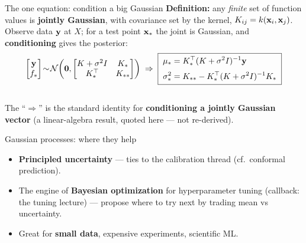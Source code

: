 \documentclass[aspectratio=169]{beamer}
\begin{document}
\begin{frame}{The one equation: condition a big Gaussian}
  \textbf{Definition:} any \emph{finite} set of function values is \textbf{jointly Gaussian}, with
  covariance set by the kernel, $K_{ij}=k(\mathbf{x}_i,\mathbf{x}_j)$. Observe data $\mathbf{y}$ at $X$; for a test point
  $\mathbf{x}_*$ the joint is Gaussian, and \textbf{conditioning} gives the posterior:
  \[
    \begin{bmatrix}\mathbf{y}\\ f_*\end{bmatrix}\!\sim\!\mathcal N\!\left(\mathbf 0,
      \begin{bmatrix}K+\sigma^2 I & K_*\\ K_*^\top & K_{**}\end{bmatrix}\right)
    \;\Rightarrow\;
    \boxed{\;\begin{aligned}
      \mu_* &= K_*^\top (K+\sigma^2 I)^{-1}\mathbf{y}\\[2pt]
      \sigma_*^2 &= K_{**} - K_*^\top(K+\sigma^2 I)^{-1}K_*
    \end{aligned}\;}
  \]
  \begin{columns}[T]
  \end{columns}
  \vskip 4pt
  {\footnotesize The ``$\Rightarrow$'' is the standard identity for \textbf{conditioning a jointly
  Gaussian vector} (a linear-algebra result, quoted here --- not re-derived).}
\end{frame}

\begin{frame}{Gaussian processes: where they help}
  \begin{itemize}\small
    \item \textbf{Principled uncertainty} --- ties to the calibration thread (cf.\ conformal
      prediction).
    \item The engine of \textbf{Bayesian optimization} for hyperparameter tuning (callback: the
      tuning lecture) --- propose where to try next by trading mean vs uncertainty.
    \item Great for \textbf{small data}, expensive experiments, scientific ML.
  \end{itemize}
  \vfill
\end{frame}
\end{document}

